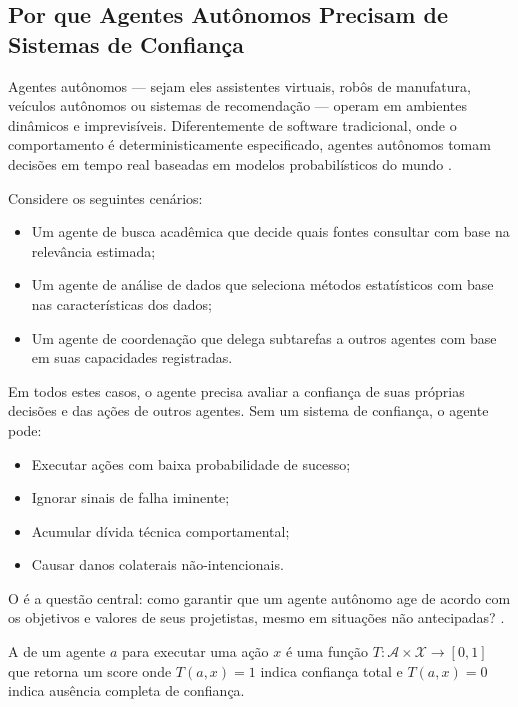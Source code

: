 \subsection{Por que Agentes Autônomos Precisam de Sistemas de Confiança}

Agentes autônomos — sejam eles assistentes virtuais, robôs de
manufatura, veículos autônomos ou sistemas de recomendação — operam em
ambientes dinâmicos e imprevisíveis. Diferentemente de software
tradicional, onde o comportamento é deterministicamente especificado,
agentes autônomos tomam decisões em tempo real baseadas em modelos
probabilísticos do mundo \cite{russell2020inteligencia, xi2023rise}.

Considere os seguintes cenários:
\begin{itemize}
\item Um agente de busca acadêmica que decide quais fontes consultar
com base na relevância estimada;
\item Um agente de análise de dados que seleciona métodos estatísticos
com base nas características dos dados;
\item Um agente de coordenação que delega subtarefas a outros agentes
com base em suas capacidades registradas.
\end{itemize}

Em todos estes casos, o agente precisa avaliar a confiança de suas
próprias decisões e das ações de outros agentes. Sem um sistema de
confiança, o agente pode:
\begin{itemize}
\item Executar ações com baixa probabilidade de sucesso;
\item Ignorar sinais de falha iminente;
\item Acumular dívida técnica comportamental;
\item Causar danos colaterais não-intencionais.
\end{itemize}

O  é a questão central: como
garantir que um agente autônomo age de acordo com os objetivos e
valores de seus projetistas, mesmo em situações não antecipadas?
\cite{russell2020inteligencia, cristiano2017deep}.

\begin{definicao}
A  de um agente $a$ para executar
uma ação $x$ é uma função $T: \mathcal{A} \times \mathcal{X} \to [0,1]$
que retorna um score onde $T(a, x) = 1$ indica confiança total e
$T(a, x) = 0$ indica ausência completa de confiança.
\end{definicao}

